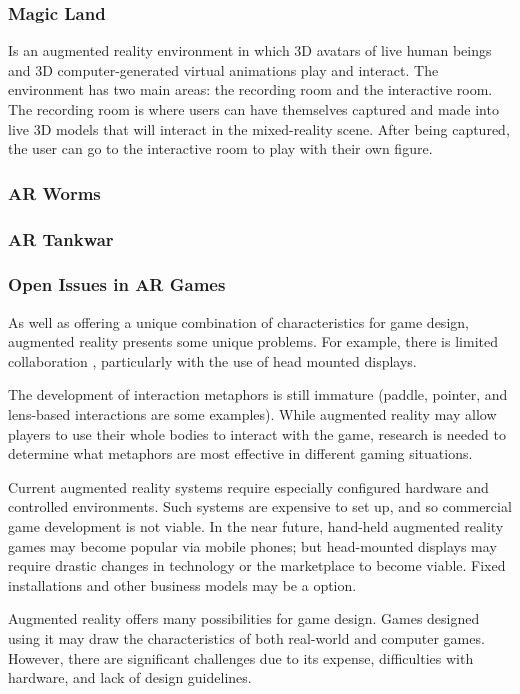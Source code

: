       \subsubsection*{Magic Land}
      Is an augmented reality environment in which 3D avatars of live human beings and 3D computer-generated virtual animations play and interact. The environment has two main areas: the recording room and the interactive room. The recording room is where users can have themselves captured and made into live 3D models that will interact in the mixed-reality scene. After being captured, the user can go to the interactive room to play with their own figure. 

      \subsubsection*{AR Worms}

      \subsubsection*{AR Tankwar}

      \subsubsection*{Open Issues in AR Games}
      As well as offering a unique combination of characteristics for game design, augmented reality presents some unique problems. 
      For example, there is limited collaboration , particularly with the use of head mounted displays. 

      The development of interaction metaphors is still immature (paddle, pointer, and lens-based interactions are some examples). While augmented reality may allow players to use their whole bodies to interact with the game, research is needed to determine what metaphors are most effective in different gaming situations. 

      Current augmented reality systems require especially configured hardware and controlled environments. Such systems are expensive to set up, and so commercial game development is not viable. In the near future, hand-held augmented reality games may become popular via mobile phones; but head-mounted displays may require drastic changes in technology or the marketplace to become viable. Fixed installations and other business models may be a option.

      Augmented reality offers many possibilities for game design. Games designed using it may draw the characteristics of both real-world and computer games. However, there are significant challenges due to its expense, difficulties with hardware, and lack of design guidelines. 

